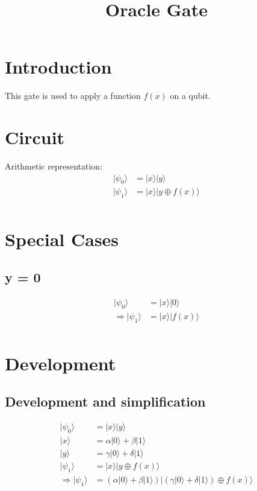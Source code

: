 \documentclass{article}
\begin{document}
\title{Oracle Gate}

\section{Introduction}
This gate is used to apply a function $f(x)$ on a qubit.

\section{Circuit}

Arithmetic representation:
\begin{equation}
    \begin{split}
        |\psi_0\rangle & = |x\rangle |y\rangle \\
        |\psi_1\rangle & = |x\rangle |y \oplus f(x)\rangle \\
    \end{split}
\end{equation}

\section{Special Cases}
\subsection{y = 0}
\begin{equation}
    \begin{split}
        |\psi_0\rangle & = |x\rangle |0\rangle \\
        \Longrightarrow |\psi_1\rangle & = |x\rangle |f(x)\rangle \\
    \end{split}
\end{equation}

\section{Development}
\subsection{Development and simplification}

\begin{equation}
    \begin{split}
        |\psi_0\rangle & = |x\rangle |y\rangle \\
        |x\rangle & = \alpha |0\rangle + \beta |1\rangle \\
        |y\rangle & = \gamma |0\rangle + \delta |1\rangle \\
        |\psi_1\rangle & = |x\rangle |y \oplus f(x)\rangle \\
        \Longrightarrow |\psi_1\rangle & = (\alpha |0\rangle + \beta |1\rangle)|(\gamma |0\rangle + \delta |1\rangle) \oplus f(x)\rangle \\
    \end{split}
\end{equation}
\end{document}
